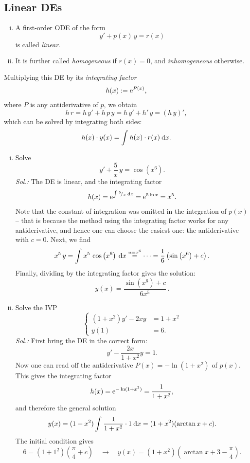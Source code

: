 \subsection{Linear DEs}

\begin{definition}
\begin{enumerate}[(i)]
	\item A first-order ODE of the form
	\[ y'+p(x)\,y=r(x) \]
	is called \emph{linear}.
	\item It is further called \emph{homogeneous} if $r(x)=0$, and \emph{inhomogeneous} otherwise.
\end{enumerate}
\end{definition}

\begin{remark} Multiplying this DE by its \emph{integrating factor}
	\[ h(x):=\mathrm{e}^{P(x)}, \]
	where $P$ is any antiderivative of $p$, we obtain
	\[ h\,r =h\,y'+h\,p\,y= h\,y'+h'\,y = (h\,y)', \]
	which can be solved by integrating both sides:
	\[ h(x) \cdot y(x) = \int_{}^{} h(x) \cdot r(x) \: \mathrm{d} x. \]
\end{remark}

\begin{example}
\begin{enumerate}[(i)]
	\item Solve \[ y' +\frac{5}{x}\,y=\cos\left( x^6 \right).\]
	{\it Sol.:} The DE is linear, and the integrating factor 
	\[ h(x) = \mathrm{e}^{\int_{}^{} {}^{5}\!/_{x} \: \mathrm{d} x} = \mathrm{e}^{5\ln x} = x^5. \]
	Note that the constant of integration was omitted in the integration of $p(x)$ -- that is because the method using the integrating factor works for any antiderivative, and hence one can choose the easiest one: the antiderivative with $c=0$. Next, we find
	\[ x^5\,y=\int_{}^{} x^5\,\cos\left(x^6\right) \: \mathrm{d} x \stackrel{u=x^6}{=} \dots 
	= \frac16\left( \sin\left( x^6 \right) + c \right). \]
	Finally, dividing by the integrating factor gives the solution:
	\[ y(x)=\frac{\sin\left(x^6\right)+c}{6x^5}\,. \]
	\item Solve the IVP
	\[ \left\{ \begin{split}
	(1+x^2)y'-2xy&=1+x^2 \\ y(1)&=6.
	\end{split} \right. \]
	{\it Sol.:} First bring the DE in the correct form:
	\[ y'-\frac{2x}{1+x^2}y=1.\]
	Now one can read off the antiderivative $P(x)=-\ln(1+x^2)$ of $p(x)$. This gives the integrating factor
	\[ h(x)=\mathrm{e}^{-\ln(1+x^2)}=\frac{1}{1+x^2}, \]
	and therefore the general solution
	\[ y(x) = (1+x^2) \int_{}^{} \frac{1}{1+x^2} \cdot 1 \: \mathrm{d} x 
	= (1+x^2)( \arctan x + c ).\]
	The initial condition gives
	\[ 6=(1+1^2)\left(\frac{\pi}{4}+c\right) \quad \rightarrow \quad
	y(x)=(1+x^2)\left( \arctan x + 3-\frac{\pi}{4} \right). \]
\end{enumerate}
\end{example}

